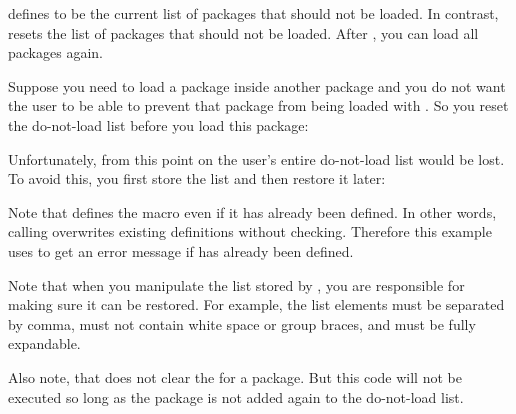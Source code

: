 \begin{Declaration}
\end{Declaration}
defines  to be the current list of packages that should not be
loaded. In contrast,
resets the list of packages that should not be loaded. After
, you can load all packages again.
\begin{Example}
  Suppose you need to load a package inside another package and you do not
  want the user to be able to prevent that package from being loaded with
  . So you reset the do-not-load list
  before you load this package:
\begin{lstcode}
  \ResetPreventPackageFromLoading
  \RequirePackage{foo}
\end{lstcode}
  Unfortunately, from this point on the user's entire do-not-load list would
  be lost. To avoid this, you first store the list and then restore it later:
\begin{lstcode}
  \newcommand*{\Users@PreventList}{}%
  \StorePreventPackageFromLoading\Users@PreventList
  \ResetPreventPackageFromLoading
  \RequirePackage{foo}
  \PreventPackageFromLoading{\Users@PreventList}
\end{lstcode}
  Note that 
  defines the  macro even if it has already been
  defined. In other words, calling 
  overwrites existing  definitions without checking. Therefore
  this example uses  to get an error message if
   has already been defined.
\end{Example}
Note that when you manipulate the list stored by
, you are responsible for making sure it
can be restored. For example, the list elements must be separated by comma,
must not contain white space or group braces, and must be fully expandable.

Also note, that 
does not clear the  for a package. But this code 
will not be executed so long as the package is not added again to the
do-not-load list.%
\EndIndexGroup


